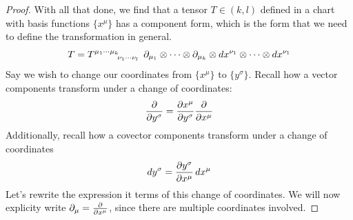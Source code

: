 \documentclass[12pt,a4paper]{article}
\begin{document}
\begin{solution_pset}
\begin{proof}
		With all that done,
		we find that a tensor $T\in(k,l)$ defined in a chart with basis functions $\{x^\mu\}$ 
		has a component form, which is the form that we need 
		to define the transformation in general.
		\begin{equation}
			\label{eq:tensor-component-form}
			T = 
			T\indices{^{\mu_1\cdots \mu_k}_{\nu_1\cdots\nu_l}}\ 
			\p_{\mu_1}\otimes \cdots \otimes \p_{\mu_k}
			\otimes
			\dd{x^{\nu_1}}\otimes \cdots \otimes \dd{x^{\nu_1}}
		\end{equation}
		Say we wish to change our coordinates from $\{x^\mu\}$ to $\{y^\sigma\}$.
		Recall how a vector components transform under a change of coordinates:
		\begin{equation}
			\label{eq:vector-transform}
			\pdv{}{y^\sigma} = \pdv{x^\mu}{y^\sigma} \pdv{}{x^\mu} 
		\end{equation}
		Additionally, recall how a covector components transform under a change 
		of coordinates
		\begin{equation}
			\label{eq:covector-transform}
			\dd{y^\sigma} = \pdv{y^\sigma}{x^\mu}\dd{x^\mu} 
		\end{equation}
		Let's rewrite the expression it terms of this change of coordinates.
		We will now explicity write $\partial_\mu = \pdv{}{x^\mu}$, since there 
		are multiple coordinates involved.


\end{proof}
\end{solution_pset}
\end{document}
